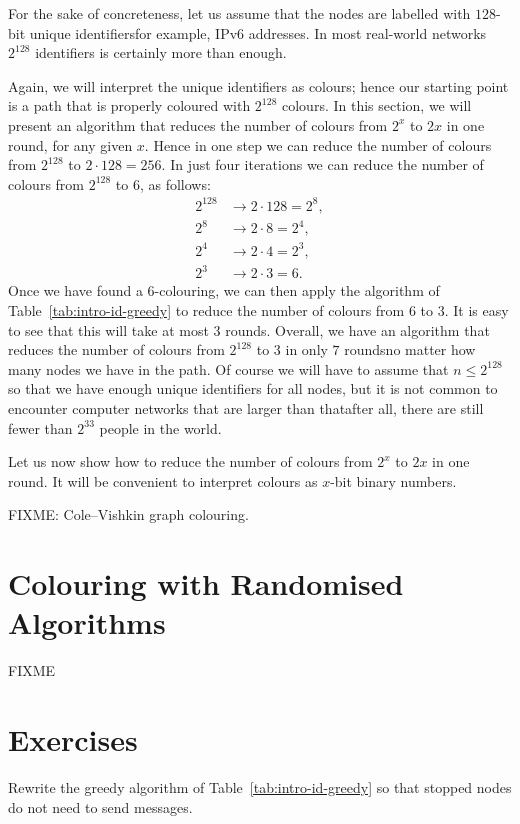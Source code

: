 For the sake of concreteness, let us assume that the nodes are labelled with $128$-bit unique identifiers\mydash for example, IPv6 addresses. In most real-world networks $2^{128}$ identifiers is certainly more than enough.

Again, we will interpret the unique identifiers as colours; hence our starting point is a path that is properly coloured with $2^{128}$ colours. In this section, we will present an algorithm that reduces the number of colours from $2^x$ to $2x$ in one round, for any given $x$. Hence in one step we can reduce the number of colours from $2^{128}$ to $2 \cdot 128 = 256$. In just four iterations we can reduce the number of colours from $2^{128}$ to $6$, as follows:
\begin{align*}
    2^{128} &\to 2 \cdot 128 = 2^8, \\
    2^8 &\to 2 \cdot 8 = 2^4, \\
    2^4 &\to 2 \cdot 4 = 2^3, \\
    2^3 &\to 2 \cdot 3 = 6.
\end{align*}
Once we have found a $6$-colouring, we can then apply the algorithm of Table~\ref{tab:intro-id-greedy} to reduce the number of colours from $6$ to $3$. It is easy to see that this will take at most $3$ rounds. Overall, we have an algorithm that reduces the number of colours from $2^{128}$ to $3$ in only $7$ rounds\mydash no matter how many nodes we have in the path. Of course we will have to assume that $n \le 2^{128}$ so that we have enough unique identifiers for all nodes, but it is not common to encounter computer networks that are larger than that\mydash after all, there are still fewer than $2^{33}$ people in the world.

Let us now show how to reduce the number of colours from $2^x$ to $2x$ in one round. It will be convenient to interpret colours as $x$-bit binary numbers.


FIXME: Cole--Vishkin graph colouring.

\section{Colouring with Randomised Algorithms}\label{sec:intro-pos-random}

FIXME

\section{Exercises}

\begin{ex}\label{ex:intro-stopped}
    Rewrite the greedy algorithm of Table~\ref{tab:intro-id-greedy} so that stopped nodes do not need to send messages.
\end{ex}

